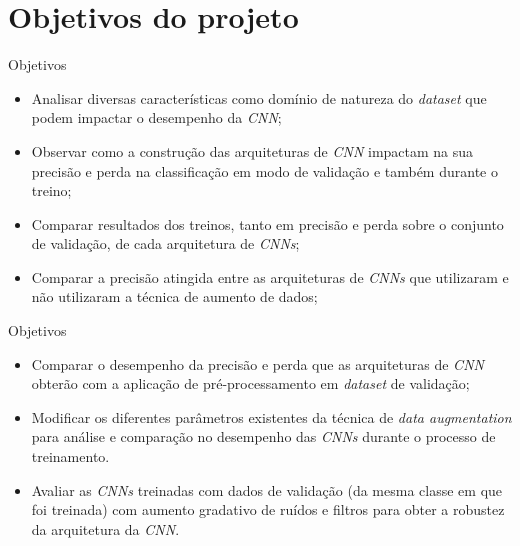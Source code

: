 \section{Objetivos do projeto}

\begin{frame}{Objetivos}
\nocite{Khan2020,8862686,chlap2021review,chollet2015keras}
\begin{itemize}
    \item Analisar diversas características como domínio de natureza do \textit{dataset} que podem impactar o desempenho da \textit{CNN};
    \item Observar como a construção das arquiteturas de \textit{CNN} impactam na sua precisão e perda na classificação em modo de validação e também durante o treino;
    \item Comparar resultados dos treinos, tanto em precisão e perda sobre o conjunto de validação, de cada arquitetura de \textit{CNNs};
    \item Comparar a precisão atingida entre as arquiteturas de \textit{CNNs} que utilizaram e não utilizaram a técnica de aumento de dados;
\end{itemize}
\end{frame}

\begin{frame}{Objetivos}
\begin{itemize}
    \item Comparar o desempenho da precisão e perda que as arquiteturas de \textit{CNN} obterão com a aplicação de pré-processamento em \textit{dataset} de validação;  
    \item Modificar os diferentes parâmetros existentes da técnica de \textit{data augmentation} para análise e comparação no desempenho das \textit{CNNs} durante o processo de treinamento.
    \item Avaliar as \textit{CNNs} treinadas com dados de validação (da mesma classe em que foi treinada) com aumento gradativo de ruídos e filtros para obter a robustez da arquitetura da \textit{CNN}.
\end{itemize}
\end{frame}